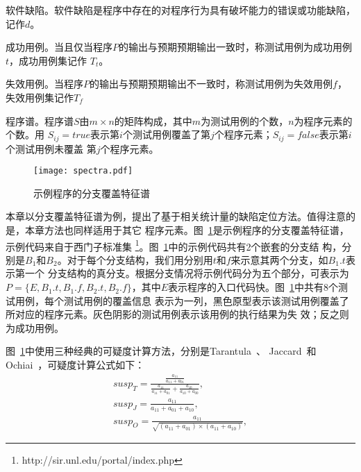 \begin{Definition}
      软件缺陷。软件缺陷是程序中存在的对程序行为具有破坏能力的错误或功能缺陷，记作$d$。
\end{Definition}

\begin{Definition}
      成功用例。当且仅当程序$P$的输出与预期预期输出一致时，称测试用例为成功用例$t$，成功用例集记作
      $T_t$。
\end{Definition}

\begin{Definition}
      失效用例。当程序$P$的输出与预期预期输出不一致时，称测试用例为失效用例$f$，失效用例集记作$T_f$
\end{Definition}

\begin{Definition}
      程序谱。程序谱$S$由$m\times n$的矩阵构成，其中$m$为测试用例的个数，$n$为程序元素的个数。用
      $S_{ij}=true$表示第$i$个测试用例覆盖了第$j$个程序元素；$S_{ij}=false$表示第$i$个测试用例未覆盖
      第$j$个程序元素。
\end{Definition}

\begin{figure}[htp]
      \centering
      \texttt{[image: spectra.pdf]}
      \caption{示例程序的分支覆盖特征谱}
      \label{fig:spectra}
\end{figure}

本章以分支覆盖特征谱为例，提出了基于相关统计量的缺陷定位方法。值得注意的是，本章方法也同样适用于其它
程序元素。图~\ref{fig:spectra}是示例程序的分支覆盖特征谱，示例代码来自于西门子标准集
\footnote{http://sir.unl.edu/portal/index.php}。图~\ref{fig:spectra}中的示例代码共有2个嵌套的分支结
构，分别是$B_1$和$B_2$。对于每个分支结构，我们用分别用$t$和$f$来示意其两个分支，如$B_1.t$表示第一个
分支结构的真分支。根据分支情况将示例代码分为五个部分，可表示为$P = \{E, B_1.t, B_1.f, B_2.t,
B_2.f\}$，其中$E$表示程序的入口代码快。图~\ref{fig:spectra}中共有8个测试用例，每个测试用例的覆盖信息
表示为一列，黑色原型表示该测试用例覆盖了所对应的程序元素。灰色阴影的测试用例表示该用例的执行结果为失
效；反之则为成功用例。

图~\ref{fig:spectra}中使用三种经典的可疑度计算方法，分别是Tarantula~\cite{jones2005empirical}、
Jaccard~\cite{abreu2007accuracy}和Ochiai~\cite{abreu2007accuracy}，可疑度计算公式如下：
\begin{eqnarray}
 susp_T = \frac{\frac{a_{11}}{a_{11}+a_{01}}}{\frac{a_{11}}{a_{11}+a_{01}}+\frac{a_{10}}{a_{10}+a_{00}}}, \label{eq:tar}\\
susp_J = \frac{a_{11}}{a_{11}+a_{01}+a_{10}}, \label{eq:jac}\\
susp_O = \frac{a_{11}}{\sqrt{(a_{11}+a_{01})\times(a_{11}+a_{10})}}, \label{eq:och}
\end{eqnarray}

